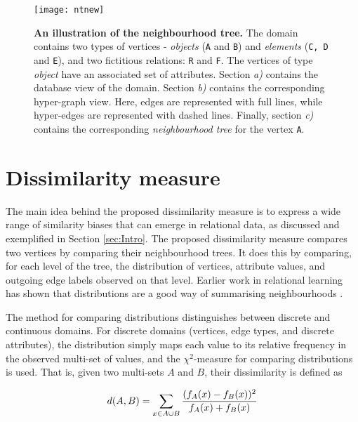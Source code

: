 \begin{figure}
  \centering
  \medskip
  \texttt{[image: ntnew]}
  \caption[An illustration of the neighbourhood tree]{\textbf{An illustration of the neighbourhood tree.} The domain contains two types of vertices - \textit{objects} (\texttt{A} and \texttt{B}) and \textit{elements} (\texttt{C, D} and \texttt{E}), and two fictitious relations: \texttt{R} and \texttt{F}. The vertices of type \textit{object} have an associated set of attributes. Section \textit{a)} contains the database view of the domain. Section \textit{b)} contains the corresponding hyper-graph view. Here, edges are represented with full lines, while hyper-edges are represented with dashed lines. Finally, section \textit{c)} contains the corresponding \textit{neighbourhood tree} for the vertex \texttt{A}.}
  \label{fig:clustering:ng}
\end{figure}




\section{Dissimilarity measure}
\label{sec:SimMes}





The main idea behind the proposed dissimilarity measure is to express a wide range of similarity biases that can emerge in relational data, as discussed and exemplified in Section \ref{sec:Intro}.
The proposed dissimilarity measure compares two vertices by comparing their neighbourhood trees.
It does this by comparing, for each level of the tree, the distribution of vertices, attribute values, and outgoing edge labels observed on that level.  Earlier work in relational learning has shown that distributions are a good way of summarising neighbourhoods \cite{Perlich:2006}.


The method for comparing distributions distinguishes between discrete and continuous domains.
For discrete domains (vertices, edge types, and discrete attributes), the distribution simply maps each value to its relative frequency in the observed multi-set of values, and the $\chi^2$-measure for comparing distributions \cite{ZhaoChiSquared} is used.
That is, given two multi-sets $A$ and $B$, their dissimilarity is defined as

\begin{equation}
d(A,B) = \sum_{x \in A \cup B} { (f_A(x)-f_B(x))^2  \over f_A(x) + f_B(x) }
\end{equation}

